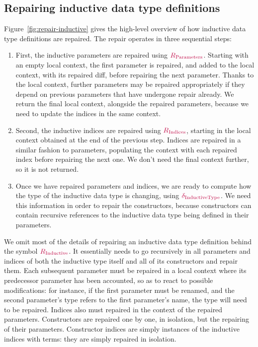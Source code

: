 \subsection{Repairing inductive data type definitions}

Figure~\ref{fig:repair-inductive} gives the high-level overview of how inductive
data type definitions are repaired.  The repair operates in three sequential
steps:

\begin{enumerate}

  \item First, the inductive parameters are repaired using
$\textcolor{purple}{R_{\text{Parameters}}}{}$.  Starting with an empty local context, the first
parameter is repaired, and added to the local context, with its repaired diff,
before repairing the next parameter.  Thanks to the local context, further
parameters may be repaired appropriately if they depend on previous parameters
that have undergone repair already.  We return the final local context,
alongside the repaired parameters, because we need to update the indices in the
same context.

  \item Second, the inductive indices are repaired using $\textcolor{purple}{R_{\text{Indices}}}{}$,
starting in the local context obtained at the end of the previous step.  Indices
are repaired in a similar fashion to parameters, populating the context with
each repaired index before repairing the next one.  We don't need the final
context further, so it is not returned.

  \item Once we have repaired parameters and indices, we are ready to compute
how the type of the inductive data type is changing, using
$\textcolor{purple}{\delta_{\text{InductiveType}}}{}$.  We need this information in order to repair the
constructors, because constructors can contain recursive references to the
inductive data type being defined in their parameters.

\end{enumerate}

We omit most of the details of repairing an inductive data type definition
behind the symbol $\textcolor{purple}{R_{\text{Inductive}}}$.  It essentially needs to go recursively in all
parameters and indices of both the inductive type itself and all of its
constructors and repair them.  Each subsequent parameter must be repaired in a
local context where its predecessor parameter has been accounted, so as to react
to possible modifications: for instance, if the first parameter must be renamed,
and the second parameter's type refers to the first parameter's name, the type
will need to be repaired.  Indices also must repaired in the context of the
repaired parameters.  Constructors are repaired one by one, in isolation, but
the repairing of their parameters.  Constructor indices are simply instances of
the inductive indices with terms: they are simply repaired in isolation.


